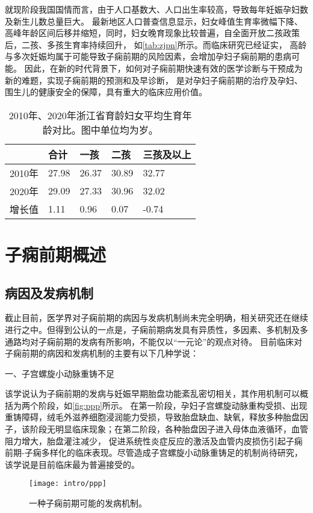 就现阶段我国国情而言，由于人口基数大、人口出生率较高，导致每年妊娠孕妇数及新生儿数总量巨大\cite{nbs2022}。
最新地区人口普查信息显示\cite{zjtjj2022}，妇女峰值生育率微幅下降、高峰年龄区间后移并缩短，同时，妇女晚育现象比较普遍，自全面开放二孩政策后，二孩、多孩生育率持续回升，
如\autoref{tab:zjpn}所示。而临床研究已经证实，
高龄与多次妊娠均属于可能导致子痫前期的风险因素，会增加孕妇子痫前期的患病可能\cite{Duckitt2005,FIGO,Yogev2010,Poon2010,Lee2000,Coonrod1995,Robillard1993}。
因此，在新的时代背景下，如何对子痫前期快速有效的医学诊断与干预成为新的难题，实现子痫前期的预测和及早诊断，
是对孕妇子痫前期的治疗及孕妇、围生儿的健康安全的保障，具有重大的临床应用价值。
\begin{table}[htbp]
    \centering
    \caption[2010年、2020年浙江省育龄妇女平均生育年龄对比]{\label{tab:zjpn}2010年、2020年浙江省育龄妇女平均生育年龄对比\cite{zjtjj2022}。图中单位均为岁。}
    \begin{tabularx}{\linewidth}{X<{\centering}X<{\centering}X<{\centering}X<{\centering}X<{\centering}}
        \toprule
            &   \textbf{合计} & \textbf{一孩} & \textbf{二孩}& \textbf{三孩及以上}\\
        \midrule
        2010年&  27.98 & 26.37 & 30.89 & 32.77     \\
        2020年&  29.09 & 27.33 & 30.96 & 32.02     \\
        增长值&  1.11 & 0.96 & 0.07 & -0.74     \\
        \bottomrule
    \end{tabularx}
\end{table}
\section{子痫前期概述}
\subsection{病因及发病机制}
截止目前，医学界对子痫前期的病因与发病机制尚未完全明确，相关研究还在继续进行之中。但得到公认的一点是，子痫前期病发具有异质性，多因素、多机制及多通路均对子痫前期的发病有所影响，不能仅以“一元论”的观点对待。
目前临床对子痫前期的病因和发病机制的主要有以下几种学说：

一、子宫螺旋小动脉重铸不足

该学说认为子痫前期的发病与妊娠早期胎盘功能紊乱密切相关\cite{OAG9,Duvekot2010,2009ix}，其作用机制可以概括为两个阶段，如\autoref{fig:ppp}所示。
在第一阶段，孕妇子宫螺旋动脉重构受损、出现重铸障碍，绒毛外滋养细胞浸润能力受损，导致胎盘缺血、缺氧，释放多种胎盘因子，该阶段无明显临床现象；在第二阶段，各种胎盘因子进入母体血液循环，血管阻力增大，胎盘灌注减少，
促进系统性炎症反应的激活及血管内皮损伤引起子痫前期-子痫多样化的临床表现。尽管造成子宫螺旋小动脉重铸足的机制尚待研究，该学说是目前临床最为普遍接受的。
\begin{figure}[htbp]
    \centering
    \texttt{[image: intro/ppp]}
    \caption[一种子痫前期可能的发病机制]{\label{fig:ppp}一种子痫前期可能的发病机制\cite{Duvekot2010,2009ix}。}
\end{figure}

